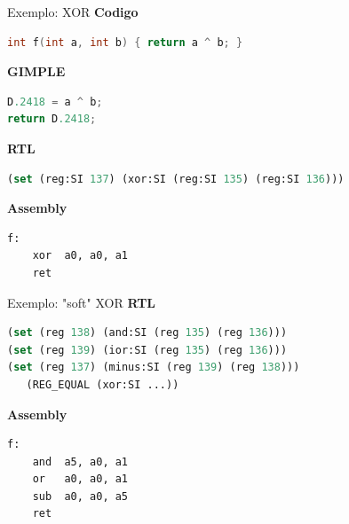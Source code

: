 \documentclass[aspectratio=169]{beamer} %
\begin{document}
\begin{frame}[fragile]{Exemplo: XOR}
    \lstset{basicstyle=\ttfamily\normalsize}
    \large
    \textbf{Codigo}
\begin{lstlisting}[language=C]
int f(int a, int b) { return a ^ b; }
\end{lstlisting}
    \textbf{GIMPLE}
\begin{lstlisting}[language=C]
D.2418 = a ^ b;
return D.2418;
\end{lstlisting}
    \textbf{RTL}
\begin{lstlisting}[language=lisp]
(set (reg:SI 137) (xor:SI (reg:SI 135) (reg:SI 136)))
\end{lstlisting}
    \textbf{Assembly}
\begin{lstlisting}
f:
    xor  a0, a0, a1
    ret
\end{lstlisting}
\end{frame}


\begin{frame}[fragile]{Exemplo: "soft" XOR}
    \lstset{basicstyle=\ttfamily\normalsize}
    \large
    \textbf{RTL}
\begin{lstlisting}[language=lisp]
(set (reg 138) (and:SI (reg 135) (reg 136)))
(set (reg 139) (ior:SI (reg 135) (reg 136)))
(set (reg 137) (minus:SI (reg 139) (reg 138)))
   (REG_EQUAL (xor:SI ...))
\end{lstlisting}
    \textbf{Assembly}
\begin{lstlisting}
f:
    and  a5, a0, a1
    or   a0, a0, a1
    sub  a0, a0, a5
    ret
\end{lstlisting}
\end{frame}
\end{document}
